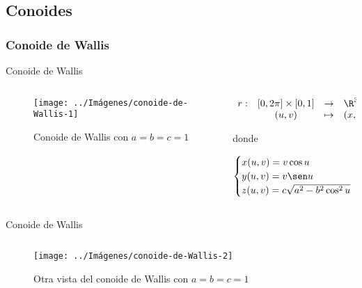 \documentclass[10pt]{beamer}
\begin{document}
	\subsection{Conoides}
	
	\subsubsection{Conoide de Wallis}
	
	\begin{frame}{Conoide de Wallis}
		\begin{columns}[t] %
			\begin{column}{.50\textwidth}
				\begin{figure}
					\centering
					\texttt{[image: ../Imágenes/conoide-de-Wallis-1]}
					\caption{Conoide de Wallis con $a=b=c=1$}
					\label{fig:conoide-de-Wallis-1}
				\end{figure}
			\end{column}%
			\hfill%
			\begin{column}{.50\textwidth}
				$$\begin{array}{rcll}
				r : & [0, 2\pi] \times [0,1] & \to & \R^3\\
				& (u,v) & \mapsto & (x,y,z)
				\end{array}$$
				
				donde 
				
				$$ \begin{cases}
				x(u,v) = v \cos u \\
				y(u,v) = v \sen u \\
				z(u,v) = c \sqrt{a^2 - b^2 \cos^2 u}
				\end{cases} $$
			\end{column}%
		\end{columns}
	\end{frame}
	
	\begin{frame}{Conoide de Wallis}
		\begin{columns}[t] %
			\begin{column}{.50\textwidth}
				\begin{figure}
					\centering
					\texttt{[image: ../Imágenes/conoide-de-Wallis-2]}
					\caption{Otra vista del conoide de Wallis con $a=b=c=1$}
					\label{fig:conoide-de-Wallis-2}
				\end{figure}
			\end{column}%
			\hfill%
			\begin{column}{.50\textwidth}
			\end{column}%
		\end{columns}
	\end{frame}
	
\end{document}

